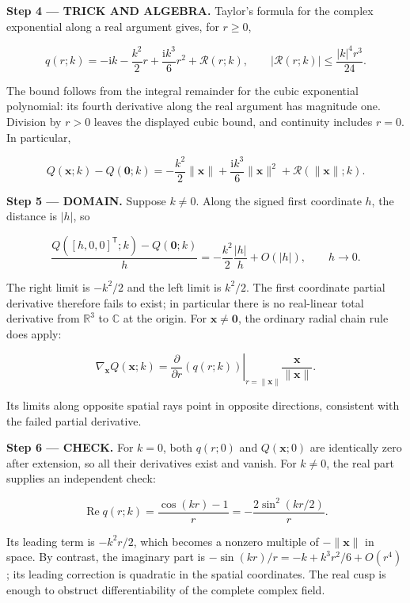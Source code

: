 \documentclass[11pt,oneside,openany]{book}
\begin{document}
\begingroup\color{TrickPurple}
\textbf{Step 4 --- TRICK AND ALGEBRA.} Taylor's formula for the complex exponential along a real argument gives, for \(r\ge0\),

\[
q(r;k)=-\mathrm{i}k-\frac{k^2}{2}r+\frac{\mathrm{i}k^3}{6}r^2+\mathcal R(r;k),
\qquad |\mathcal R(r;k)|\le\frac{|k|^4r^3}{24}.
\]

The bound follows from the integral remainder for the cubic exponential polynomial: its fourth derivative along the real argument has magnitude one. Division by \(r>0\) leaves the displayed cubic bound, and continuity includes \(r=0\). In particular,

\[
Q(\mathbf x;k)-Q(\mathbf0;k)
=-\frac{k^2}{2}\|\mathbf x\|
+\frac{\mathrm{i}k^3}{6}\|\mathbf x\|^2
+\mathcal R(\|\mathbf x\|;k).
\]

\endgroup
\begin{DomainStep}
\textbf{Step 5 --- DOMAIN.} Suppose \(k\ne0\). Along the signed first coordinate \(h\), the distance is \(|h|\), so

\[
\frac{Q([h,0,0]^{\mathsf T};k)-Q(\mathbf0;k)}{h}
=-\frac{k^2}{2}\frac{|h|}{h}+O(|h|),\qquad h\to0.
\]

The right limit is \(-k^2/2\) and the left limit is \(k^2/2\). The first coordinate partial derivative therefore fails to exist; in particular there is no real-linear total derivative from \(\mathbb R^3\) to \(\mathbb C\) at the origin. For \(\mathbf x\ne\mathbf0\), the ordinary radial chain rule does apply:

\[
\nabla_{\mathbf x}Q(\mathbf x;k)
=\left.\frac{\partial}{\partial r}\left(q(r;k)\right)\right|_{r=\|\mathbf x\|}
\frac{\mathbf x}{\|\mathbf x\|}.
\]

Its limits along opposite spatial rays point in opposite directions, consistent with the failed partial derivative.

\end{DomainStep}
\textbf{Step 6 --- CHECK.} For \(k=0\), both \(q(r;0)\) and \(Q(\mathbf x;0)\) are identically zero after extension, so all their derivatives exist and vanish. For \(k\ne0\), the real part supplies an independent check:

\[
\operatorname{Re}q(r;k)=\frac{\cos(kr)-1}{r}
=-\frac{2\sin^2(kr/2)}{r}.
\]

Its leading term is \(-k^2r/2\), which becomes a nonzero multiple of \(-\|\mathbf x\|\) in space. By contrast, the imaginary part is \(-\sin(kr)/r=-k+k^3r^2/6+O(r^4)\); its leading correction is quadratic in the spatial coordinates. The real cusp is enough to obstruct differentiability of the complete complex field.
\end{document}
